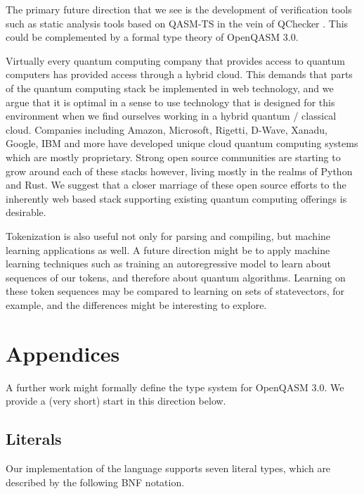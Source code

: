 \documentclass{article}
\begin{document}
The primary future direction that we see is the development of verification tools such as static analysis tools based on QASM-TS in the vein of QChecker \cite{zhao_qchecker_2023}. This could be complemented by a formal type theory of OpenQASM 3.0.

Virtually every quantum computing company that provides access to quantum computers has provided access through a hybrid cloud. This demands that parts of the quantum computing stack be implemented in web technology, and we argue that it is optimal in a sense to use technology that is designed for this environment when we find ourselves working in a hybrid quantum / classical cloud. Companies including Amazon, Microsoft, Rigetti, D-Wave, Xanadu, Google, IBM and more have developed unique cloud quantum computing systems which are mostly proprietary. Strong open source communities are starting to grow around each of these stacks however, living mostly in the realms of Python and Rust. We suggest that a closer marriage of these open source efforts to the inherently web based stack supporting existing quantum computing offerings is desirable.

Tokenization is also useful not only for parsing and compiling, but machine learning applications as well. A future direction might be to apply machine learning techniques such as training an autoregressive model to learn about sequences of our tokens, and therefore about quantum algorithms. Learning on these token sequences may be compared to learning on sets of statevectors, for example, and the differences might be interesting to explore.

\section{Appendices}

A further work might formally define the type system for OpenQASM 3.0. We provide a (very short) start in this direction below.

\subsection{Literals}

Our implementation of the language supports seven literal types, which are described by the following BNF notation.
\end{document}
